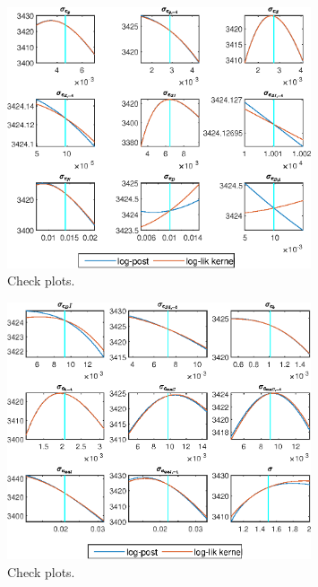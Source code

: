  
\begin{figure}[H]
\centering 
\includegraphics[width=0.80\textwidth]{BRS_sectoral_rest/graphs/BRS_sectoral_rest_CheckPlots1}
\caption{Check plots.}\label{Fig:CheckPlots:1}
\end{figure}
 
\begin{figure}[H]
\centering 
\includegraphics[width=0.80\textwidth]{BRS_sectoral_rest/graphs/BRS_sectoral_rest_CheckPlots2}
\caption{Check plots.}\label{Fig:CheckPlots:2}
\end{figure}
 
